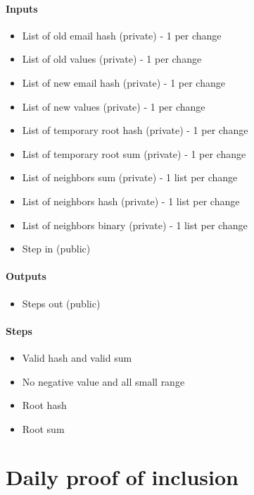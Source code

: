 \paragraph{Inputs}
\begin{itemize}
   \item List of old email hash (private) - 1 per change
   \item List of old values (private) - 1 per change
   \item List of new email hash (private) - 1 per change
   \item List of new values (private) - 1 per change
   \item List of temporary root hash (private) - 1 per change
   \item List of temporary root sum (private) - 1 per change
   \item List of neighbors sum (private) - 1 list per change
   \item List of neighbors hash (private) - 1 list per change
   \item List of neighbors binary (private) - 1 list per change
   \item Step in (public)
   \end{itemize}

\paragraph{Outputs}
\begin{itemize}
   \item Steps out (public)
   \end{itemize}

\paragraph{Steps}
\begin{itemize}
   \item Valid hash and valid sum
   \item No negative value and all small range
   \item Root hash
   \item Root sum
   \end{itemize}



\section{Daily proof of inclusion}

